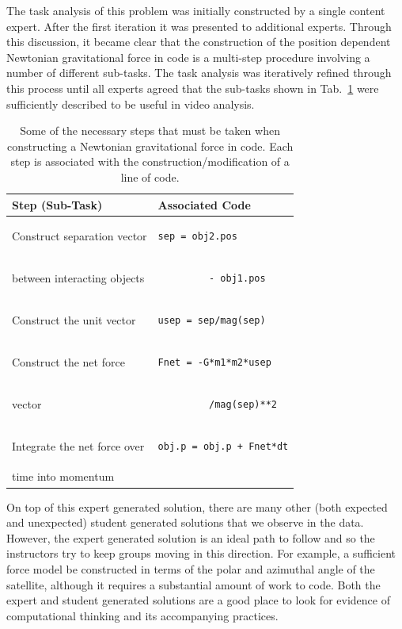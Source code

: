 \documentclass{msuphddissertation}
\begin{document}
\begin{doublespace}
The task analysis of this problem was initially constructed by a single content expert. After the first iteration it was presented to additional experts. Through this discussion, it became clear that the construction of the position dependent Newtonian gravitational force in code is a multi-step procedure involving a number of different sub-tasks. The task analysis was iteratively refined through this process until all experts agreed that the sub-tasks shown in Tab.~\ref{CH3:TaskAnalysis} were sufficiently described to be useful in video analysis.

\begin{table}[hb]\centering
\begin{tabular}{ll}
\textbf{Step (Sub-Task)} & \textbf{Associated Code} \\\hline
Construct separation vector & \begin{lstlisting}
sep = obj2.pos
\end{lstlisting}\\
between interacting objects & \begin{lstlisting}
         - obj1.pos
\end{lstlisting}\\\hline
Construct the unit vector & \begin{lstlisting}
usep = sep/mag(sep)
\end{lstlisting}\\\hline
Construct the net force & \begin{lstlisting}
Fnet = -G*m1*m2*usep
\end{lstlisting}\\
vector & \begin{lstlisting}
         /mag(sep)**2
\end{lstlisting}\\\hline
Integrate the net force over & \begin{lstlisting}
obj.p = obj.p + Fnet*dt
\end{lstlisting}\\
time into momentum & \\
\end{tabular}\caption{Some of the necessary steps that must be taken when constructing a Newtonian gravitational force in code.  Each step is associated with the construction/modification of a line of code.\label{CH3:TaskAnalysis}}
\end{table}
 
On top of this expert generated solution, there are many other (both expected and unexpected) student generated solutions that we observe in the data.  However, the expert generated solution is an ideal path to follow and so the instructors try to keep groups moving in this direction.  For example, a sufficient force model be constructed in terms of the polar and azimuthal angle of the satellite, although it requires a substantial amount of work to code.  Both the expert and student generated solutions are a good place to look for evidence of computational thinking and its accompanying practices. 


\end{doublespace}
\end{document}
